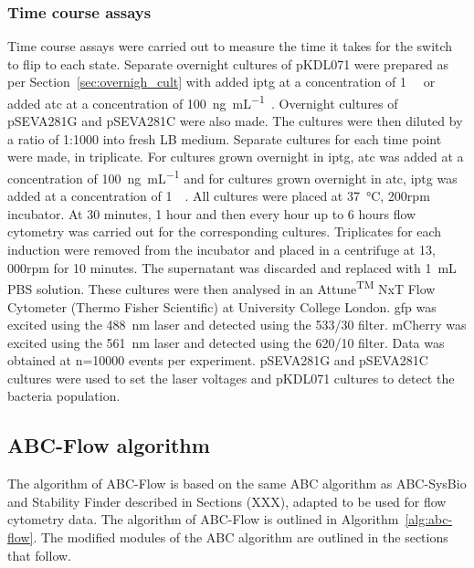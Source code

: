 \subsubsection{Time course assays}
\label{sec:flo_time}
Time course assays were carried out to measure the time it takes for the switch to flip to each state. Separate overnight cultures of pKDL071 were prepared as per Section~\ref{sec:overnigh_cult} with added \acrshort{iptg} at a concentration of \SI{1}{\milli\molar} or added \acrshort{atc} at a concentration of \SI{100}{\nano\gram\per\milli\liter}~\autocite{Litcofsky:2012gr}. Overnight cultures of pSEVA281G and pSEVA281C were also made. The cultures were then diluted by a ratio of 1:1000 into fresh LB medium. Separate cultures for each time point were made, in triplicate. For cultures grown overnight in \acrshort{iptg}, \acrshort{atc} was added at a concentration of \SI{100}{\nano\gram\per\milli\liter} and for cultures grown overnight in \acrshort{atc}, \acrshort{iptg} was added at a concentration of \SI{1}{\milli\molar}. All cultures were placed at \SI{37}{\celsius}, 200rpm incubator. At 30 minutes, 1 hour and then every hour up to 6 hours flow cytometry was carried out for the corresponding cultures. Triplicates for each induction were removed from the incubator and placed in a centrifuge at 13, 000rpm for 10 minutes. The supernatant was discarded and replaced with \SI{1}{\milli\liter} PBS solution. These cultures were then analysed in an Attune\textsuperscript{TM} NxT Flow Cytometer (Thermo Fisher Scientific) at University College London. \acrshort{gfp} was excited using the \SI{488}{\nano\meter} laser and detected using the 533/30 filter. mCherry was excited using the \SI{561}{\nano\meter} laser and detected using the 620/10 filter. Data was obtained at n=10000 events per experiment. pSEVA281G and pSEVA281C cultures were used to set the laser voltages and pKDL071 cultures to detect the bacteria population.  

\subsection{ABC-Flow algorithm}
\label{sec:abcflow-meth}

The algorithm of ABC-Flow is based on the same ABC algorithm as ABC-SysBio and Stability Finder described in Sections (XXX), adapted to be used for flow cytometry data. The algorithm of ABC-Flow is outlined in Algorithm~\ref{alg:abc-flow}. The modified modules of the ABC algorithm are outlined in the sections that follow.

